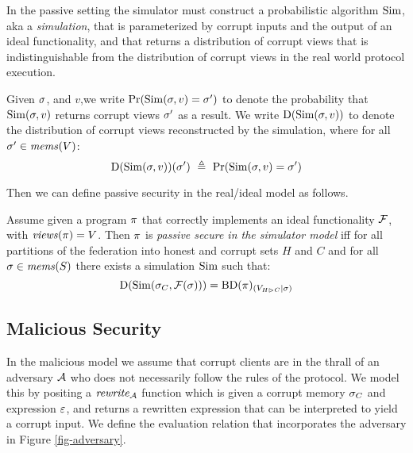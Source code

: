 In the passive setting the simulator must construct a probabilistic
algorithm $\mathrm{Sim}$, aka a \emph{simulation}, that is parameterized by
corrupt inputs and the output of an ideal functionality, and that
returns a distribution of corrupt views that is indistinguishable
from the distribution of corrupt views in the real world
protocol execution.
\begin{definition}
  Given $\sigma$, and $v$,we write $ \mathrm{Pr}(\mathrm{Sim}(\sigma,v) = \sigma') $
  to denote the probability that $\mathrm{Sim}(\sigma,v)$ returns corrupt views
  $\sigma'$ as a result. We write $\mathrm{D}(\mathrm{Sim}(\sigma,v))$ to
  denote the distribution of corrupt views reconstructed by the
  simulation, where for
  all $\sigma' \in \mathit{mems}(V)$:
  $$
  \dist(\SIM(\store,v))(\store')\ \defeq\ \prob(\SIM(\store,v) = \store') 
  $$
\end{definition}
Then we can define passive security in the real/ideal
model as follows. 
\begin{definition}
  Assume given a program $\pi$ that correctly implements an ideal
  functionality $\mathcal{F}$, with $\mathit{views}(\pi) = V$.  Then $\pi$
  is \emph{passive secure in the simulator model} iff for all
  partitions of the federation into honest and corrupt sets $H$ and $C$
  and for all $\sigma \in \mathit{mems}(S)$ there exists a
  simulation $\mathrm{Sim}$ such that:
  $$
  \mathrm{D}(\mathrm{Sim}(\sigma_{C},\mathcal{F}(\sigma))) = \mathrm{BD}(\pi)_{({V_{H \rhd C}}|{\sigma})}
  $$
\end{definition}

\subsection{Malicious Security}

In the malicious model we assume that corrupt clients are in the
thrall of an adversary $\mathcal{A}$ who does not necessarily follow
the rules of the protocol.  We model this by positing a $\mathit{rewrite}_{\mathcal{A}}$
function which is given a corrupt memory $\sigma_C$ and expression
$\varepsilon$, and returns a rewritten expression that can be interpreted to
yield a corrupt input. We define the evaluation relation that
incorporates the adversary in Figure \ref{fig-adversary}.

\adversaryfig

